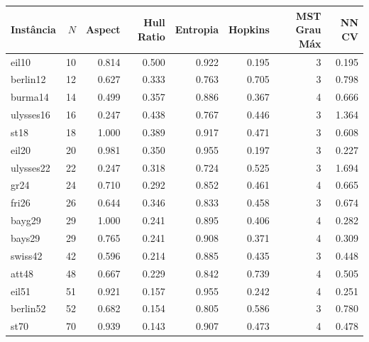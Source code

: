 \begin{tabular}{lrrrrrrr}
\hline
\textbf{Instância} & $N$ & \textbf{Aspect} & \textbf{Hull Ratio} & \textbf{Entropia} & \textbf{Hopkins} & \textbf{MST Grau Máx} & \textbf{NN CV} \\
\hline
eil10 & 10 & 0.814 & 0.500 & 0.922 & 0.195 & 3 & 0.195 \\
berlin12 & 12 & 0.627 & 0.333 & 0.763 & 0.705 & 3 & 0.798 \\
burma14 & 14 & 0.499 & 0.357 & 0.886 & 0.367 & 4 & 0.666 \\
ulysses16 & 16 & 0.247 & 0.438 & 0.767 & 0.446 & 3 & 1.364 \\
st18 & 18 & 1.000 & 0.389 & 0.917 & 0.471 & 3 & 0.608 \\
eil20 & 20 & 0.981 & 0.350 & 0.955 & 0.197 & 3 & 0.227 \\
ulysses22 & 22 & 0.247 & 0.318 & 0.724 & 0.525 & 3 & 1.694 \\
gr24 & 24 & 0.710 & 0.292 & 0.852 & 0.461 & 4 & 0.665 \\
fri26 & 26 & 0.644 & 0.346 & 0.833 & 0.458 & 3 & 0.674 \\
bayg29 & 29 & 1.000 & 0.241 & 0.895 & 0.406 & 4 & 0.282 \\
bays29 & 29 & 0.765 & 0.241 & 0.908 & 0.371 & 4 & 0.309 \\
swiss42 & 42 & 0.596 & 0.214 & 0.885 & 0.435 & 3 & 0.448 \\
att48 & 48 & 0.667 & 0.229 & 0.842 & 0.739 & 4 & 0.505 \\
eil51 & 51 & 0.921 & 0.157 & 0.955 & 0.242 & 4 & 0.251 \\
berlin52 & 52 & 0.682 & 0.154 & 0.805 & 0.586 & 3 & 0.780 \\
st70 & 70 & 0.939 & 0.143 & 0.907 & 0.473 & 4 & 0.478 \\
\hline
\end{tabular}
